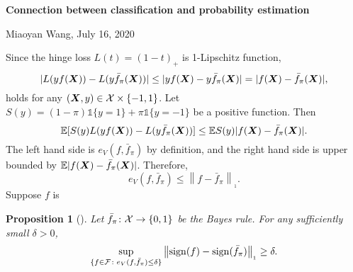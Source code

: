 \documentclass[11pt]{article}
\theoremstyle{plain}
\newtheorem{prop}{Proposition}
\theoremstyle{definition}
\newcommand{\onenormSize}[1]{\left\lVert#1\right\rVert_{_1}}
\begin{document}
\begin{center}
{\Large \bf Connection between classification and probability estimation}

Miaoyan Wang, July 16, 2020
\end{center}

Since the hinge loss $L(t)=(1-t)_{+}$ is 1-Lipschitz function,
\[
|L(yf(\bm X))- L(y\bar f_\pi(\bm X))| \leq |yf(\bm X)-y\bar f_\pi(\bm X)|=|f(\bm X)-\bar f_\pi(\bm X)|,
\]
holds for any $(\bm X,y)\in \mathcal{X}\times \{-1,1\}$. Let $S(y)=(1-\pi)\mathds{1}\{y=1\}+\pi\mathds{1}\{y=-1\}$ be a positive function. Then
\[
\mathbb{E}[S(y)L(yf(\bm X))- L(y\bar f_\pi(\bm X))]\leq \mathbb{E}S(y)|f(\bm X)-\bar f_\pi(\bm X)|.
\]
The left hand side is $e_V(f, \bar f_\pi)$ by definition, and the right hand side is upper bounded by $\mathbb{E}|f(\bm X)-\bar f_\pi(\bm X)|$. Therefore,
\[
e_V(f,\bar f_\pi)\leq \onenormSize{f-\bar f_\pi}.
\]
Suppose $f$ is 
\begin{prop}[]Let $\bar f_\pi\colon \mathcal{X}\to\{0,1\}$ be the Bayes rule. For any sufficiently small $\delta>0$,
\[
\sup_{\{f\in \tF\colon e_V(f, \bar f_\pi) \leq \delta\}}\onenormSize{\mathrm{sign}(f)-\mathrm{sign}(\bar f_\pi)}\geq \delta.
\]
\end{prop}
\end{document}
